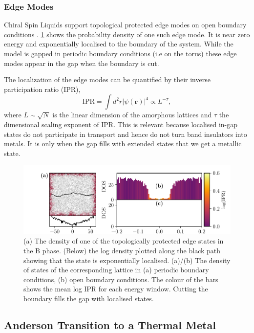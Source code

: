 \hypertarget{edge-modes}{%
\subsubsection{Edge Modes}\label{edge-modes}}

Chiral Spin Liquids support topological protected edge modes on open boundary conditions \autocite{qi_general_2006}. \cref{fig:edge_modes} shows the probability density of one such edge mode. It is near zero energy and exponentially localised to the boundary of the system. While the model is gapped in periodic boundary conditions (i.e on the torus) these edge modes appear in the gap when the boundary is cut.

The localization of the edge modes can be quantified by their inverse participation ratio (IPR), \[\mathrm{IPR} = \int d^2r|\psi(\mathbf{r})|^4  \propto L^{-\tau},\] where \(L\sim\sqrt{N}\) is the linear dimension of the amorphous lattices and \(\tau\) the dimensional scaling exponent of IPR. This is relevant because localised in-gap states do not participate in transport and hence do not turn band insulators into metals. It is only when the gap fills with extended states that we get a metallic state.

\hypertarget{fig:edge_modes}{%
\begin{figure}
\centering
\includegraphics[width=1\textwidth,height=\textheight]{figure_code/amk_chapter/results/edge_modes/edge_modes}
\caption[{Edges States and Density of States}]{(a) The density of one of the topologically protected edge states in the B phase. (Below) the log density plotted along the black path showing that the state is exponentially localised. (a)/(b) The density of states of the corresponding lattice in (a) periodic boundary conditions, (b) open boundary conditions. The colour of the bars shows the mean log IPR for each energy window. Cutting the boundary fills the gap with localised states.}
\label{fig:edge_modes}
\end{figure}
}

\hypertarget{anderson-transition-to-a-thermal-metal}{%
\subsection{Anderson Transition to a Thermal Metal}\label{anderson-transition-to-a-thermal-metal}}

